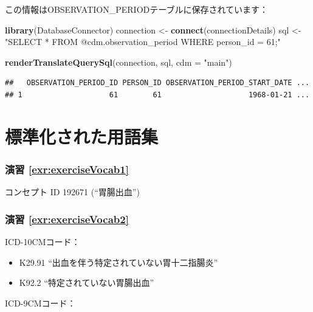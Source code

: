 \documentclass[
  11pt]{book}
\newenvironment{Shaded}{\begin{snugshade}}{\end{snugshade}}
\newcommand{\AttributeTok}[1]{\textcolor[rgb]{0.13,0.29,0.53}{#1}}
\newcommand{\FunctionTok}[1]{\textcolor[rgb]{0.13,0.29,0.53}{\textbf{#1}}}
\newcommand{\NormalTok}[1]{#1}
\newcommand{\OtherTok}[1]{\textcolor[rgb]{0.56,0.35,0.01}{#1}}
\newcommand{\StringTok}[1]{\textcolor[rgb]{0.31,0.60,0.02}{#1}}
\providecommand{\tightlist}{%
  \setlength{\itemsep}{0pt}\setlength{\parskip}{0pt}}
\theoremstyle{definition}
\theoremstyle{definition}
\theoremstyle{definition}
\theoremstyle{definition}
\theoremstyle{remark}
\begin{document}
この情報はOBSERVATION\_PERIODテーブルに保存されています：

\begin{Shaded}
\begin{Highlighting}[]
\FunctionTok{library}\NormalTok{(DatabaseConnector)}
\NormalTok{connection }\OtherTok{\textless{}{-}} \FunctionTok{connect}\NormalTok{(connectionDetails)}
\NormalTok{sql }\OtherTok{\textless{}{-}} \StringTok{"SELECT *}
\StringTok{FROM @cdm.observation\_period}
\StringTok{WHERE person\_id = 61;"}

\FunctionTok{renderTranslateQuerySql}\NormalTok{(connection, sql, }\AttributeTok{cdm =} \StringTok{"main"}\NormalTok{)}
\end{Highlighting}
\end{Shaded}

\begin{verbatim}
##   OBSERVATION_PERIOD_ID PERSON_ID OBSERVATION_PERIOD_START_DATE ...
## 1                    61        61                    1968-01-21 ...
\end{verbatim}

\section{標準化された用語集}\label{Vocabanswers}

\subsubsection*{演習 \ref{exr:exerciseVocab1}}\label{ux6f14ux7fd2-refexrexercisevocab1}

コンセプト ID 192671 (``胃腸出血'')

\subsubsection*{演習 \ref{exr:exerciseVocab2}}\label{ux6f14ux7fd2-refexrexercisevocab2}

ICD-10CMコード：

\begin{itemize}
\tightlist
\item
  K29.91 ``出血を伴う特定されていない胃十二指腸炎''
\item
  K92.2 ``特定されていない胃腸出血''
\end{itemize}

ICD-9CMコード：
\end{document}
